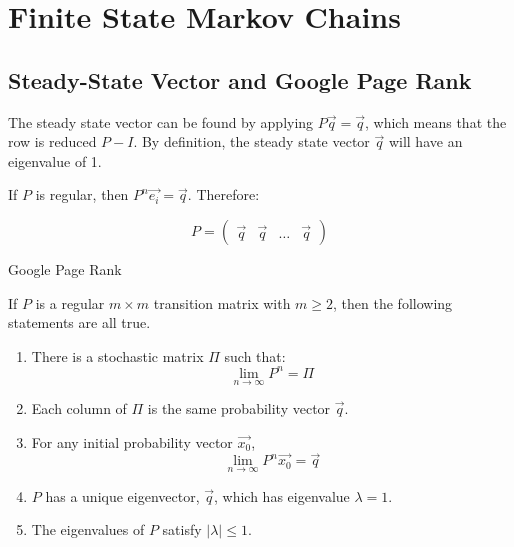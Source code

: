 \section{Finite State Markov Chains}
\subsection{Steady-State Vector and Google Page Rank}
The steady state vector can be found by applying \(P\Vec{q}=\Vec{q}\), which means that the row is reduced \(P-I\). By definition, the steady state vector \(\Vec{q}\) will have an eigenvalue of 1.

\noindent
If \(P\) is regular, then \(P^n \Vec{e_i}=\Vec{q}\). Therefore:

\begin{equation}
    P = \begin{pmatrix}
        \Vec{q} & \Vec{q} & \dots & \Vec{q}
    \end{pmatrix}
\end{equation}

\begin{theorem} Google Page Rank

If \(P\) is a regular \(m \times m\) transition matrix with \(m \ge 2\), then the following statements are all true.
\begin{enumerate}
    \item There is a stochastic matrix \(\Pi\) such that:
    \[\lim_{n\rightarrow\infty} P^n=\Pi\]
    \item Each column of \(\Pi\) is the same probability vector \(\Vec{q}\).
    \item For any initial probability vector \(\Vec{x_0}\),
    \[\lim_{n\rightarrow\infty} P^n \Vec{x_0} = \Vec{q}\]
    \item \(P\) has a unique eigenvector, \(\Vec{q}\), which has eigenvalue \(\lambda=1\).
    \item The eigenvalues of \(P\) satisfy \(|\lambda| \le 1\).
\end{enumerate}
    
\end{theorem}

